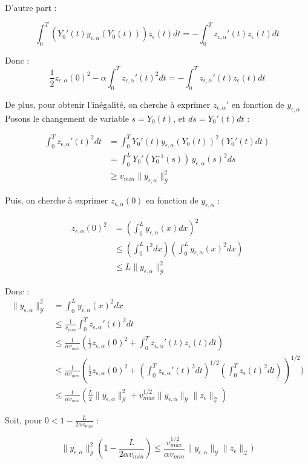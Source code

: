 \documentclass[a4paper]{article}
\newcommand{\Y}{\mathscr{Y}}
\newcommand{\Z}{\mathscr{Z}}
\newcommand{\yea}{y_{\epsilon, \alpha}}
\newcommand{\zea}{z_{\epsilon, \alpha}}
\begin{document}
D'autre part :

\[
\int_0^T (Y_0'(t)\yea(Y_0(t))) z_{\epsilon}(t)dt 
= - \int_0^T \zea'(t)z_{\epsilon}(t) dt
\]

Donc :
\[
\displaystyle \frac{1}{2}\zea(0)^2 
	 - \alpha \int_0^T \zea'(t)^2 dt
	 = - \int_0^T \zea'(t)z_{\epsilon}(t) dt
\]

De plus, pour obtenir l'inégalité, 
on cherche à exprimer $\zea'$ en fonction de $\yea$
Posons le changement de variable $s = Y_0(t)$,
et $ds = Y_0'(t)dt$ :

\[
\begin{split}
\int_0^T \zea'(t)^2 dt & = \int_0^T Y_0'(t)\yea(Y_0(t))^2 (Y_0'(t)dt) \\
                       & = \int_0^L Y_0'(Y_0^{-1}(s)) \, \yea(s)^2 ds\\
					   & \geq v_{min} \| \yea \|_{\Y}^2
\end{split}
\]

Puis, on cherche à exprimer $\zea(0)$ en fonction de $\yea$ :

\[
\begin{split}
	\zea(0)^2 &= (\int_0^L \yea(x)dx)^2 \\
	          & \leq (\int_0^L 1^2dx)(\int_0^L \yea(x)^2 dx) \\
			  & \leq L \| \yea \|_{\Y}^2
\end{split}
\]

Donc :
\[
\begin{split}
\| \yea \|_{\Y}^2 &= \int_0^L \yea(x)^2 dx \\
                  &\leq \displaystyle \frac{1}{v_{min}}
				      \int_0^T \zea'(t)^2 dt \\ 
				  &\leq \displaystyle \frac{1}{\alpha v_{min}}
				      (\displaystyle \frac{1}{2}\zea(0)^2 
				      + \int_0^T \zea'(t)z_{\epsilon}(t) dt)\\
					  &\leq \displaystyle \frac{1}{\alpha v_{min}}
					      (\displaystyle \frac{1}{2}\zea(0)^2 
					      + (\int_0^T \zea'(t)^2 dt)^{1/2}
						   (\int_0^Tz_{\epsilon}(t)^2 dt)\,)^{1/2})\\
				  &\leq \displaystyle \frac{1}{\alpha v_{min}}
				      (\frac{L}{2}  \| \yea \|_{\Y}^2
				      +  v_{max}^{1/2} \| \yea \|_{\Y}
					  \|z_{\epsilon} \|_{\Z})
\end{split}
\]

Soit, pour $0< 1-\displaystyle \frac{L}{2\alpha v_{min}} $  :

\[
\| \yea \|_{\Y}^2 (1-\displaystyle \frac{L}{2\alpha v_{min}})
  \leq \frac{v_{max}^{1/2}}{\alpha v_{min}}  \| \yea \|_{\Y} \|z_{\epsilon} \|_{\Z})
\]				  
\end{document}
